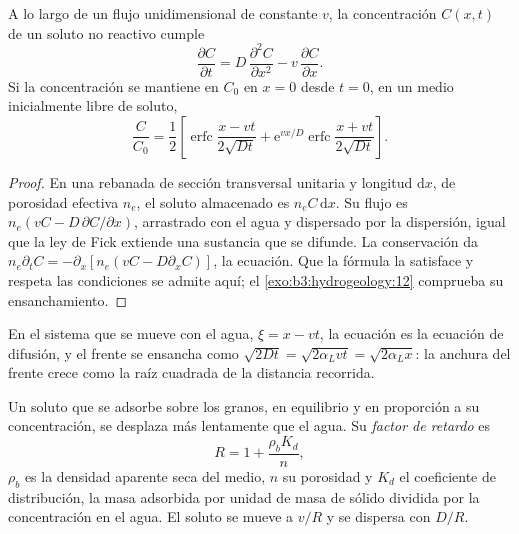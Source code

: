 \begin{theorem}\label{thm:b3:hydrogeology:ade}
A lo largo de un flujo unidimensional de  constante $v$, la
concentración $C(x, t)$ de un soluto no reactivo cumple
\[
\frac{\partial C}{\partial t} = D\,\frac{\partial^2C}{\partial x^2} -
v\,\frac{\partial C}{\partial x} .
\]
Si la concentración se mantiene en $C_0$ en $x = 0$ desde $t = 0$, en un medio
inicialmente libre de soluto,
\[
\frac{C}{C_0} = \frac12\left[\operatorname{erfc}\frac{x - vt}{2\sqrt{Dt}} +
\mathrm e^{vx/D}\operatorname{erfc}\frac{x + vt}{2\sqrt{Dt}}\right] .
\]
\end{theorem}

\begin{proof}
En una rebanada de sección transversal unitaria y longitud $\mathrm dx$, de
porosidad efectiva $n_e$, el soluto almacenado es $n_eC\,\mathrm dx$. Su flujo es
$n_e(vC - D\,\partial C/\partial x)$, arrastrado con el agua y dispersado por
la dispersión, igual que la ley de Fick extiende una sustancia que se difunde. La conservación da
$n_e\partial_tC = -\partial_x[n_e(vC - D\partial_xC)]$, la ecuación. Que
la fórmula la satisface y respeta las condiciones se admite aquí;
el \cref{exo:b3:hydrogeology:12} comprueba su ensanchamiento.
\end{proof}

En el sistema que se mueve con el agua, $\xi = x - vt$, la ecuación es la
ecuación de difusión, y el frente se ensancha como $\sqrt{2Dt} = \sqrt{2\alpha_L
vt} = \sqrt{2\alpha_Lx}$: la anchura del frente crece como la raíz cuadrada
de la distancia recorrida.

\begin{definition}\label{def:b3:hydrogeology:retardation}
Un soluto que se adsorbe sobre los granos, en equilibrio y en proporción
a su concentración, se desplaza más lentamente que el agua. Su
\emph{factor de retardo} es
\[
R = 1 + \frac{\rho_bK_d}{n} ,
\]
$\rho_b$ es la densidad aparente seca del medio, $n$ su porosidad y
$K_d$ el coeficiente de distribución, la masa adsorbida por unidad de masa de
sólido dividida por la concentración en el agua. El soluto se mueve a $v/R$
y se dispersa con $D/R$.
\end{definition}

